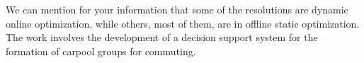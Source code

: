 \documentclass[12pt, a4paper,twoside]{memoir}
\begin{document}
	We can mention for your information that some of the resolutions are dynamic online optimization, while others, most of them, are in offline static optimization.
	The work involves the development of a decision support system for the formation of carpool groups for commuting.
	
	\backmatter
	\cleardoublepage
	
	
	
	
	\cleardoublepage
	\appendix
\end{document}
